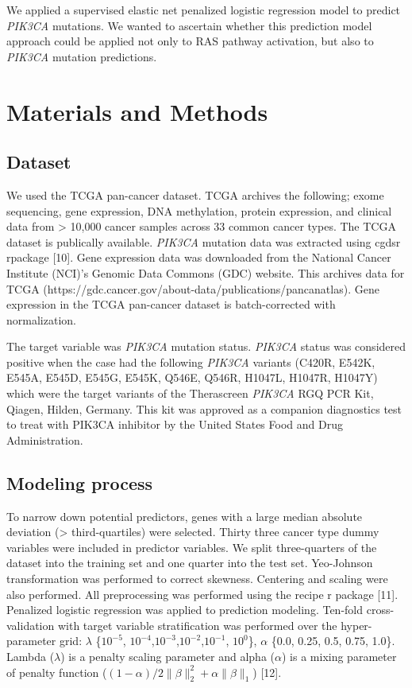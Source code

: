 \documentclass[10pt,letterpaper]{article}
\begin{document}
We applied a supervised elastic net penalized logistic regression model
to predict \emph{PIK3CA} mutations. We wanted to ascertain whether this
prediction model approach could be applied not only to RAS pathway
activation, but also to \emph{PIK3CA} mutation predictions.

\hypertarget{materials-and-methods}{%
\section{Materials and Methods}\label{materials-and-methods}}

\hypertarget{dataset}{%
\subsection{Dataset}\label{dataset}}

We used the TCGA pan-cancer dataset. TCGA archives the following; exome
sequencing, gene expression, DNA methylation, protein expression, and
clinical data from \textgreater{} 10,000 cancer samples across 33 common
cancer types. The TCGA dataset is publically available. \emph{PIK3CA}
mutation data was extracted using cgdsr rpackage {[}10{]}. Gene
expression data was downloaded from the National Cancer Institute
(NCI)'s Genomic Data Commons (GDC) website. This archives data for TCGA
(https://gdc.cancer.gov/about-data/publications/pancanatlas). Gene
expression in the TCGA pan-cancer dataset is batch-corrected with
normalization.

The target variable was \emph{PIK3CA} mutation status. \emph{PIK3CA}
status was considered positive when the case had the following
\emph{PIK3CA} variants (C420R, E542K, E545A, E545D, E545G, E545K, Q546E,
Q546R, H1047L, H1047R, H1047Y) which were the target variants of the
Therascreen \emph{PIK3CA} RGQ PCR Kit, Qiagen, Hilden, Germany. This kit
was approved as a companion diagnostics test to treat with PIK3CA
inhibitor by the United States Food and Drug Administration.

\hypertarget{modeling-process}{%
\subsection{Modeling process}\label{modeling-process}}

To narrow down potential predictors, genes with a large median absolute
deviation (\textgreater{} third-quartiles) were selected. Thirty three
cancer type dummy variables were included in predictor variables. We
split three-quarters of the dataset into the training set and one
quarter into the test set. Yeo-Johnson transformation was performed to
correct skewness. Centering and scaling were also performed. All
preprocessing was performed using the recipe r package {[}11{]}.
Penalized logistic regression was applied to prediction modeling.
Ten-fold cross-validation with target variable stratification was
performed over the hyper-parameter grid: \(\lambda\) \{\(10^{-5}\),
\(10^{-4}\),\(10^{-3}\),\(10^{-2}\),\(10^{-1}\), \(10^{0}\)\},
\(\alpha\) \{0.0, 0.25, 0.5, 0.75, 1.0\}. Lambda (\(\lambda\)) is a
penalty scaling parameter and alpha (\(\alpha\)) is a mixing parameter
of penalty function
(\((1-\alpha)/2 \lVert\beta\rVert_2^2+\alpha\lVert \beta \rVert_1\))
{[}12{]}.
\end{document}
